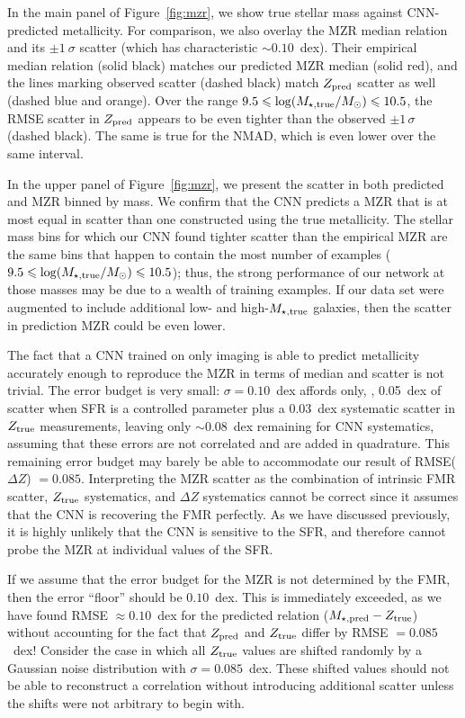 \documentclass[fleqn,usenatbib]{mnras}
\begin{document}
In the main panel of Figure~\ref{fig:mzr}, we show true stellar mass against CNN-predicted metallicity. For comparison, we also overlay the \cite{Tremonti2004} MZR median relation and its $\pm 1~\sigma$ scatter (which has characteristic $\sim 0.10$~dex). Their empirical median relation (solid black) matches our predicted MZR median (solid red), and the lines marking observed scatter (dashed black) match $Z_{\rm pred}$ scatter as well (dashed blue and orange). Over the range $9.5 \leqslant \log (M_{\star, \rm true}/\hbox{$M_\odot$}) \leqslant 10.5$, the RMSE scatter in $Z_{\rm pred}$ appears to be even tighter than the observed $\pm 1\,\sigma$ (dashed black). The same is true for the NMAD, which is even lower over the same interval.

In the upper panel of Figure~\ref{fig:mzr}, we present the scatter in both predicted and \cite{Tremonti2004} MZR binned by mass. We confirm that the CNN predicts a MZR that is at most equal in scatter than one constructed using the true metallicity. The stellar mass bins for which our CNN found tighter scatter than the empirical MZR are the same bins that happen to contain the most number of examples ($9.5 \leqslant \log (M_{\star, \rm true}/\hbox{$M_\odot$}) \leqslant 10.5$); thus, the strong performance of our network at those masses may be due to a wealth of training examples.
If our data set were augmented to include additional low- and high-$M_{\rm \star,true}$ galaxies, then the scatter in prediction MZR could be even lower.

The fact that a CNN trained on only \sdssi\sdssr\sdssg{} imaging is able to predict metallicity accurately enough to reproduce the MZR in terms of median and scatter is not trivial. The error budget is very small: $\sigma = 0.10$~dex affords only, \eg, 0.05~dex of scatter when SFR is a controlled parameter plus a 0.03~dex systematic scatter in $Z_{\rm true}$ measurements, leaving only $\sim 0.08$~dex remaining for CNN systematics, assuming that these errors are not correlated and are added in quadrature. This remaining error budget may barely be able to accommodate our result of RMSE($\Delta Z$) $= 0.085$. 
Interpreting the MZR scatter as the combination of intrinsic FMR scatter, $Z_{\rm true}$ systematics, and $\Delta Z$ systematics cannot be correct since it assumes that the CNN is recovering the FMR perfectly.
As we have discussed previously, it is highly unlikely that the CNN is sensitive to the SFR, and therefore cannot probe the MZR at individual values of the SFR.

If we assume that the error budget for the MZR is not determined by the FMR, then the error ``floor'' should be $0.10$~dex.
This is immediately exceeded, as we have found RMSE $\approx 0.10$~dex for the predicted relation ($M_{\star,\rm pred}-Z_{\rm true}$) without accounting for the fact that $Z_{\rm pred}$ and $Z_{\rm true}$ differ by RMSE $= 0.085$~dex!
Consider the case in which all $Z_{\rm true}$ values are shifted randomly by a Gaussian noise distribution with $\sigma = 0.085$~dex.
These shifted values should not be able to reconstruct a correlation without introducing additional scatter unless the shifts were not arbitrary to begin with.
\end{document}
